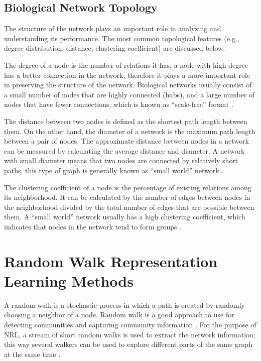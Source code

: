 \subsection{Biological Network Topology}

The structure of the network plays an important role in analyzing and understanding its performance. The most common topological features (e.g., degree distribution, distance, clustering coefficient) are discussed below.

The degree of a node is the number of relations it has, a node with high degree has a better connection in the network, therefore it plays a more important role in preserving the structure of the network.
Biological networks usually consist of a small number of nodes that are highly connected (hubs), and a large number of nodes that have fewer connections, which is known as “scale-free” format \cite{zhu_getting_2007}.

The distance between two nodes is defined as the shortest path length between them. On the other hand, the diameter of a network is the maximum path length between a pair of nodes.
The approximate distance between nodes in a network can be measured by calculating the average distance and diameter. A network with small diameter means that two nodes are connected by relatively short paths, this type of graph is generally known as “small world” network \cite{zhu_getting_2007}.

The clustering coefficient of a node is the percentage of existing relations among its neighborhood.
It can be calculated by the number of edges between nodes in the neighborhood divided by the total number of edges that are possible between them.
A “small world” network usually has a high clustering coefficient, which indicates that nodes in the network tend to form groups \cite{zhu_getting_2007}. 

\section{Random Walk Representation Learning Methods}

A random walk is a stochastic process in which a path is created by randomly choosing a neighbor of a node.
Random walk is a good approach to use for detecting communities and capturing community information \cite{perozzi_deepwalk:_2014}.
For the purpose of \ac{NRL}, a stream of short random walks is used to extract the network information; this way several walkers can be used to explore different parts of the same graph at the same time \cite{perozzi_deepwalk:_2014}.

